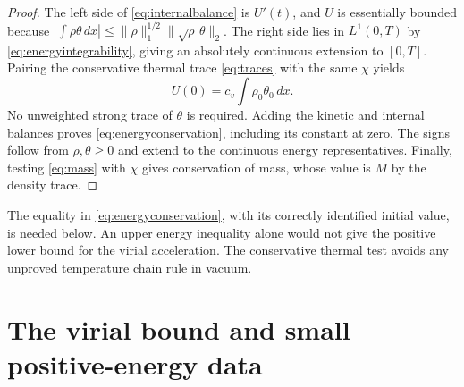 \documentclass[10pt,twoside]{article}
\newcommand{\dd}{\,dx}
\newcommand{\norm}[2]{\lVert#1\rVert_{#2}}
\begin{document}
\begin{proof}
The left side of \eqref{eq:internalbalance} is $U'(t)$, and
$U$ is essentially bounded because
$\left|\int\rho\theta\dd\right|
\le\norm{\rho}{1}^{1/2}\norm{\sqrt\rho\,\theta}{2}$.
The right side lies in $L^1(0,T)$ by
\eqref{eq:energyintegrability}, giving an absolutely continuous
extension to $[0,T]$. Pairing the conservative thermal trace
\eqref{eq:traces} with the same $\chi$ yields
\[
 U(0)=c_v\int\rho_0\theta_0\dd.
\]
No unweighted strong trace of $\theta$ is required.
Adding the kinetic and internal balances proves
\eqref{eq:energyconservation}, including its constant at zero.
The signs follow from $\rho,\theta\ge0$ and extend to the
continuous energy representatives. Finally, testing
\eqref{eq:mass} with $\chi$ gives conservation of mass, whose
value is $M$ by the density trace.
\end{proof}

The equality in \eqref{eq:energyconservation}, with its correctly
identified initial value, is needed below. An upper energy
inequality alone would not give the positive lower bound for the
virial acceleration. The conservative thermal test avoids any
unproved temperature chain rule in vacuum.

\section{The virial bound and small positive-energy data}\label{sec:virial}
\end{document}
